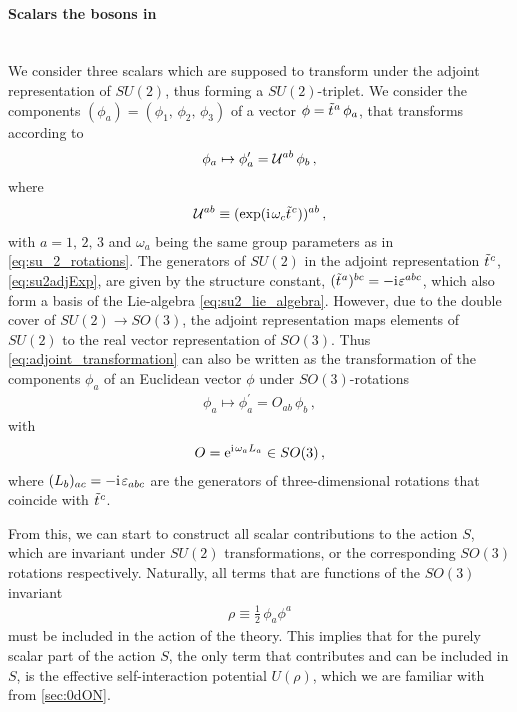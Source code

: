 \paragraph{Scalars \dash{} the bosons in \texorpdfstring{\dzero{}}{d=0}}\label{paragraph:0dSU2modelBosons}\mbox{}\\%
We consider three scalars which are supposed to transform under the adjoint representation of $SU(2)$, thus forming a $SU(2)$-triplet.
We consider the components $(\phi_a) = (\phi_1 ,\, \phi_2 ,\, \phi_3)$ of a vector $\phi = \tilde{t}\mkern1.0mu{}^{a} \, \phi_a$, that transforms according to
	\begin{align}
		\phi_a \mapsto \phi^\prime_a = \mathcal{U}{}^{ab}\, \phi_b \, ,	\label{eq:adjoint_transformation}
	\end{align}
where
\begin{align}
	\suNU{}^{ab}\equiv (\exp(\iu \vts \omega_c\suIIta{c}))^{ab} \, ,	\label{eq:adjoint_group_elements}
\end{align}
with $a = 1,\, 2,\, 3$ and $\omega_a$ being the same group parameters as in \cref{eq:su_2_rotations}. 
The generators of $SU(2)$ in the adjoint representation $\tilde{t}\mkern1.0mu{}^{c}$, \cf{} \cref{eq:su2adjExp}, are given by the structure constant, $(\tilde{t}\mkern1.0mu{}^{a})^{b c}=-\mathrm{i}\mkern1mu \varepsilon^{a b c}$, which also form a basis of the Lie-algebra \eqref{eq:su2_lie_algebra}.
However, due to the double cover of $SU(2) \rightarrow SO(3)$, the adjoint representation maps elements of $SU(2)$ to the real vector representation of $SO(3)$.
Thus \cref{eq:adjoint_transformation} can also be written as the transformation of the components $\phi_a$ of an Euclidean vector $\phi$ under $SO(3)$-rotations
\begin{align}
	\phi_a \mapsto \phi^\prime_a = O_{a b} \, \phi_b \, ,
\end{align}
with
\begin{align}
	O = \eu^{ \iu \vts\omega_a L_a} \in SO(3) \, ,	\label{eq:so_3_rotation}
\end{align}
where $(L_b)_{ac} = -\iu\vts \varepsilon_{a b c}$ are the generators of three-dimensional rotations that coincide with $\tilde{t}\mkern1.0mu{}^{c}$.
	
From this, we can start to construct all scalar contributions to the action $S$, which are invariant under $SU(2)$ transformations, or the corresponding $SO(3)$ rotations respectively.
Naturally, all terms that are functions of the $SO(3)$ invariant
\begin{align}
	\rho \equiv \tfrac{1}{2} \, \phi_a \phi^a \label{eq:definition_so_3_invariantSU2}
\end{align}
must be included in the action of the theory.
This implies that for the purely scalar part of the action $S$, the only term that contributes and can be included in $S$, is the effective self-interaction potential $U(\rho)$, which we are familiar with from \cref{sec:0dON}.

